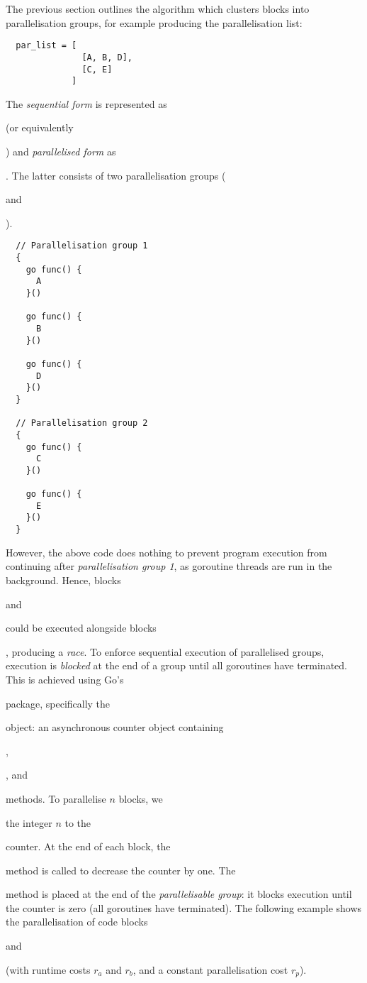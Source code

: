 The previous section outlines the algorithm which clusters blocks into parallelisation groups, for example producing the parallelisation list:

\begin{verbatim}
  par_list = [
               [A, B, D],
               [C, E]
             ]
\end{verbatim}

The \textit{sequential form} is represented as  (or equivalently ) and \textit{parallelised form} as . The latter consists of two parallelisation groups ( and ).

\begin{verbatim}
  // Parallelisation group 1
  {
    go func() { 
      A
    }()

    go func() { 
      B
    }()

    go func() { 
      D
    }()
  }

  // Parallelisation group 2 
  {
    go func() { 
      C
    }()

    go func() { 
      E
    }() 
  }
\end{verbatim}

However, the above code does nothing to prevent program execution from continuing after \textit{parallelisation group 1}, as goroutine threads are run in the background. Hence, blocks  and  could be executed alongside blocks , producing a \textit{race}. To enforce sequential execution of parallelised groups, execution is \textit{blocked} at the end of a group until all goroutines have terminated. This is achieved using Go's  package, specifically the  object: an asynchronous counter object containing , , and  methods. To parallelise \( n \) blocks, we  the integer \( n \) to the  counter. At the end of each block, the  method is called to decrease the counter by one. The  method is placed at the end of the \textit{parallelisable group}: it blocks execution until the counter is zero (all goroutines have terminated). The following example shows the parallelisation of code blocks  and  (with runtime costs \( r_a \) and \( r_b \), and a constant parallelisation cost \( r_p \)).

